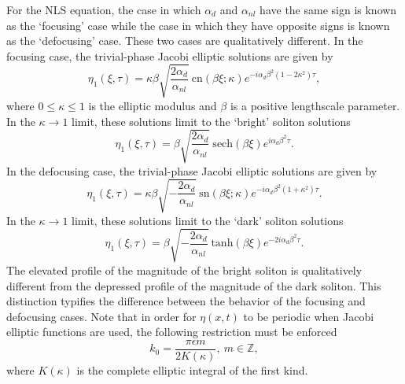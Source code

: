 \documentclass{JFM_Style/jfm}
\begin{document}
For the NLS equation, the case in which $\alpha_{d}$ and $\alpha_{nl}$ have the same sign is known as the `focusing' case while the case in which they have opposite signs is known as the `defocusing' case.  These two cases are qualitatively different.  In the focusing case, the trivial-phase Jacobi elliptic solutions are given by
\begin{equation}
\eta_{1}(\xi,\tau) = \kappa\beta \sqrt{\frac{2\alpha_{d}}{\alpha_{nl}}}~\mbox{cn}(\beta \xi;\kappa)e^{-i\alpha_{d}\beta^{2}(1-2\kappa^2)\tau},
\label{cnsolns}
\end{equation}
where $0\le\kappa\le1$ is the elliptic modulus and $\beta$ is a positive lengthscale parameter.  In the $\kappa \rightarrow 1$ limit, these solutions limit to the `bright' soliton solutions
\[
\eta_{1}(\xi,\tau)=\beta \sqrt{\frac{2\alpha_{d}}{\alpha_{nl}}}~\mbox{sech}(\beta \xi)e^{i\alpha_{d}\beta^{2}\tau}.
\]
In the defocusing case, the trivial-phase Jacobi elliptic solutions are given by
\begin{equation}
\eta_{1}(\xi,\tau) = \kappa\beta \sqrt{-\frac{2\alpha_{d}}{\alpha_{nl}}}~\mbox{sn}(\beta \xi;\kappa) e^{-i\alpha_{d}\beta^{2}(1+\kappa^2)\tau}.
\label{snsolns}
\end{equation}
In the $\kappa\rightarrow1$ limit, these solutions limit to the `dark'
soliton solutions
\[
\eta_{1}(\xi,\tau)=\beta \sqrt{-\frac{2\alpha_{d}}{\alpha_{nl}}}~ \mbox{tanh}(\beta \xi)  e^{-2i\alpha_{d}\beta^{2}\tau}.
\]
The elevated profile of the magnitude of the bright soliton is qualitatively different from the depressed profile of the magnitude of the dark soliton.  This distinction typifies the difference between the behavior of the focusing and defocusing cases.  Note that in order for $\eta(x,t)$ to be periodic when Jacobi elliptic functions are used, the following restriction must be enforced
\begin{equation}
k_{0} = \frac{\pi \epsilon m}{2K(\kappa)},~ m\in \mathbb{Z},
\label{jacwavnum}
\end{equation}
where $K(\kappa)$ is the complete elliptic integral of the first kind.
\end{document}
